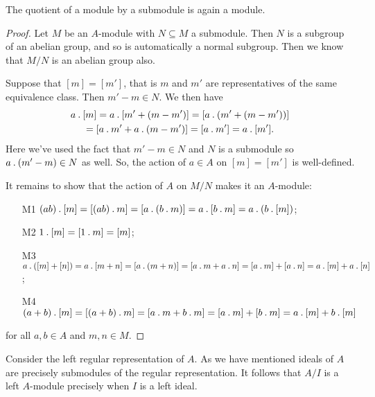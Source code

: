 \begin{lma}{}{}
    The quotient of a module by a submodule is again a module.
    \begin{proof}
        Let \(M\) be an \(A\)-module with \(N \subseteq M\) a submodule.
        Then \(N\) is a subgroup of an abelian group, and so is automatically a normal subgroup.
        Then we know that \(M/N\) is an abelian group also.
        
        Suppose that \([m] = [m']\), that is \(m\) and \(m'\) are representatives of the same equivalence class.
        Then \(m' - m \in N\).
        We then have
        \begin{multline}
            a \mathbin{.} [m] = a \mathbin{.} [m' + (m - m')] = [a \mathbin{.} (m' + (m - m'))]\\
            = [a \mathbin{.} m' + a \mathbin{.} (m - m')] = [a \mathbin{.} m'] = a \mathbin{.} [m'].
        \end{multline}
        Here we've used the fact that \(m' - m \in N\) and \(N\) is a submodule so \(a \mathbin{.} (m' - m) \in N\) as well.
        So, the action of \(a \in A\) on \([m] = [m']\) is well-defined.
        
        It remains to show that the action of \(A\) on \(M/N\) makes it an \(A\)-module:
        \begin{itemize}
            \item[M1] \((ab) \mathbin{.} [m] = [(ab) \mathbin{.} m] = [a \mathbin{.} (b \mathbin{.} m)] = a \mathbin{.} [b \mathbin{.} m] = a \mathbin{.} (b \mathbin{.} [m])\);
            \item[M2] \(1 \mathbin{.} [m] = [1 \mathbin{.} m] = [m]\);
            \item[M3] \(a \mathbin{.} ([m] + [n]) = a \mathbin{.} [m + n] = [a \mathbin{.} (m + n)] = [a \mathbin{.} m + a \mathbin{.} n] = [a \mathbin{.} m] + [a \mathbin{.} n] = a \mathbin{.} [m] + a \mathbin{.} [n]\);
            \item[M4] \((a + b) \mathbin{.} [m] = [(a + b) \mathbin{.} m] = [a \mathbin{.} m + b \mathbin{.} m] = [a \mathbin{.} m] + [b \mathbin{.} m] = a \mathbin{.} [m] + b \mathbin{.} [m]\)
        \end{itemize}
        for all \(a, b \in A\) and \(m, n \in M\).
    \end{proof}
\end{lma}

\begin{remark}{}{}
    Consider the left regular representation of \(A\).
    As we have mentioned ideals of \(A\) are precisely submodules of the regular representation.
    It follows that \(A/I\) is a left \(A\)-module precisely when \(I\) is a left ideal.
\end{remark}

